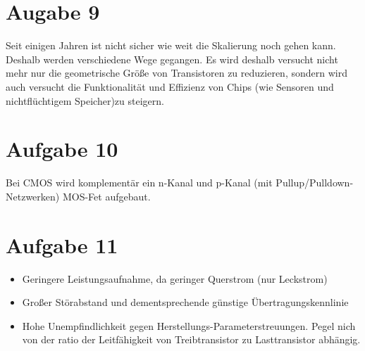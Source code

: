 \documentclass[a4paper]{scrartcl}
\begin{document}
\section*{Augabe 9}
Seit einigen Jahren ist nicht sicher wie weit die Skalierung noch gehen kann. Deshalb werden verschiedene Wege gegangen. Es wird deshalb versucht nicht mehr nur die geometrische Größe von Transistoren zu reduzieren, sondern wird auch versucht die Funktionalität und Effizienz von Chips (wie Sensoren und nichtflüchtigem Speicher)zu steigern.


\section*{Aufgabe 10}
Bei CMOS wird komplementär ein n-Kanal und p-Kanal (mit Pullup/Pulldown-Netzwerken) MOS-Fet aufgebaut.


\section*{Aufgabe 11}
\begin{itemize}
	\item Geringere Leistungsaufnahme, da geringer Querstrom (nur Leckstrom)
	\item Großer Störabstand und dementsprechende günstige Übertragungskennlinie
	\item Hohe Unempfindlichkeit gegen Herstellungs-Parameterstreuungen. Pegel nich von der ratio der Leitfähigkeit von Treibtransistor zu Lasttransistor abhängig.
\end{itemize}
\end{document}
